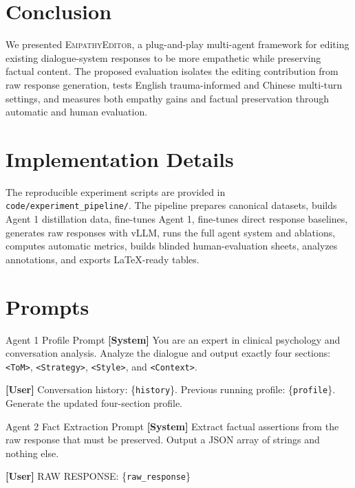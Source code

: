 \documentclass[11pt]{article}
\newcommand{\systemprompt}[1]{%
    \textbf{\textcolor{systemcolor}{[System]}} #1%
}
\newcommand{\userprompt}[1]{%
    \textbf{\textcolor{usercolor}{[User]}} #1%
}
\begin{document}
\section{Conclusion}

We presented \textsc{EmpathyEditor}, a plug-and-play multi-agent framework for editing existing dialogue-system responses to be more empathetic while preserving factual content. The proposed evaluation isolates the editing contribution from raw response generation, tests English trauma-informed and Chinese multi-turn settings, and measures both empathy gains and factual preservation through automatic and human evaluation.

%


\appendix

\section{Implementation Details}
\label{appendix:implementation}

The reproducible experiment scripts are provided in \texttt{code/experiment\_pipeline/}. The pipeline prepares canonical datasets, builds Agent 1 distillation data, fine-tunes Agent 1, fine-tunes direct response baselines, generates raw responses with vLLM, runs the full agent system and ablations, computes automatic metrics, builds blinded human-evaluation sheets, analyzes annotations, and exports LaTeX-ready tables.

\section{Prompts}
\label{appendix:prompts}

\begin{promptbox}{Agent 1 Profile Prompt}
\small
\systemprompt{You are an expert in clinical psychology and conversation analysis. Analyze the dialogue and output exactly four sections: \texttt{<ToM>}, \texttt{<Strategy>}, \texttt{<Style>}, and \texttt{<Context>}.}
\userprompt{Conversation history: \{\texttt{history}\}. Previous running profile: \{\texttt{profile}\}. Generate the updated four-section profile.}
\end{promptbox}

\begin{promptbox}{Agent 2 Fact Extraction Prompt}
\small
\systemprompt{Extract factual assertions from the raw response that must be preserved. Output a JSON array of strings and nothing else.}
\userprompt{RAW RESPONSE: \{\texttt{raw\_response}\}}
\end{promptbox}
\end{document}
